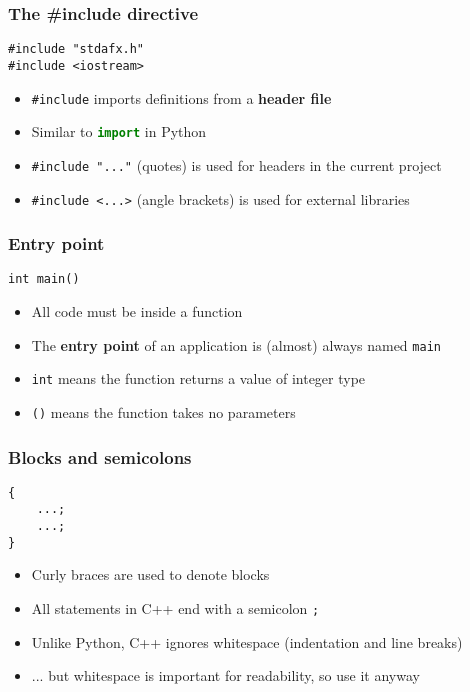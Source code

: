 \begin{frame}[fragile]
	\frametitle{The \#include directive}
	\begin{lstlisting}
#include "stdafx.h"
#include <iostream>
	\end{lstlisting}
	\begin{itemize}
		\item \lstinline{#include} imports definitions from a \textbf{header file}
		\item Similar to \lstinline[language=Python]{import} in Python
		\item \lstinline{#include "..."} (quotes) is used for headers in the current project
		\item \lstinline{#include <...>} (angle brackets) is used for external libraries
	\end{itemize}
\end{frame}

\begin{frame}[fragile]
	\frametitle{Entry point}
	\begin{lstlisting}
int main()
	\end{lstlisting}
	\begin{itemize}
		\item All code must be inside a function
		\item The \textbf{entry point} of an application is (almost) always named \lstinline{main}
		\item \lstinline{int} means the function returns a value of integer type
		\item \lstinline{()} means the function takes no parameters
	\end{itemize}
\end{frame}

\begin{frame}[fragile]
	\frametitle{Blocks and semicolons}
	\begin{lstlisting}
{
    ...;
    ...;
}
	\end{lstlisting}
	\begin{itemize}
		\item Curly braces are used to denote blocks
		\item All statements in C++ end with a semicolon \lstinline{;}
		\item Unlike Python, C++ ignores whitespace (indentation and line breaks)
		\item ... but whitespace is important for readability, so use it anyway
	\end{itemize}
\end{frame}

